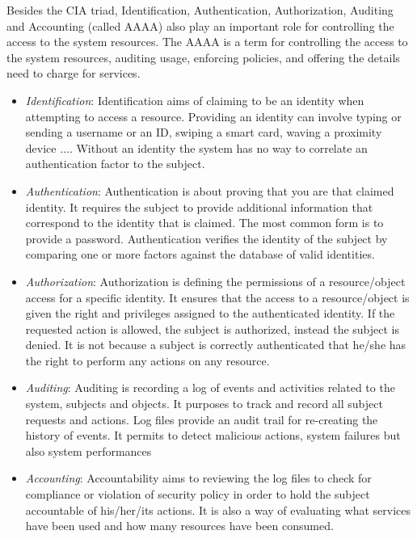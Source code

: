Besides the CIA triad, Identification, Authentication, Authorization, Auditing and Accounting (called AAAA) also play an important role for controlling the access to the system resources. The AAAA is a term for controlling the access to the system resources, auditing usage, enforcing policies, and offering the details need to charge for services.
\begin{itemize}
    \setlength\itemsep{1em}
    \item \emph{Identification}: Identification aims of claiming to be an identity when attempting to access a resource. Providing an identity can involve typing or sending a username or an ID, swiping a smart card, waving a proximity device $\ldots$. Without an identity the system has no way to correlate an authentication factor to the subject. 
    \item \emph{Authentication}: Authentication is about proving that you are that claimed identity. It requires the subject to provide additional information that correspond to the identity that is claimed. The most common form is to provide a password. Authentication verifies the identity of the subject by comparing one or more factors against the database of valid identities.
    \item \emph{Authorization}: Authorization is defining the permissions of a resource/object access for a specific identity. It ensures that the access to a resource/object is given the right and privileges assigned to the authenticated identity. If the requested action is allowed, the subject is authorized, instead the subject is denied. It is not because a subject is correctly authenticated that he/she has the right to perform any actions on any resource.
    \item \emph{Auditing}: Auditing is recording a log of events and activities related to the system, subjects and objects. It purposes to track and record all subject requests and actions. Log files provide an audit trail for re-creating the history of events. It permits to detect malicious actions, system failures but also system performances
    \item \emph{Accounting}: Accountability aims to reviewing the log files to check for compliance or violation of security policy in order to hold the subject accountable of his/her/its actions. It is also a way of evaluating what services have been used and how many resources have been consumed.
\end{itemize}



